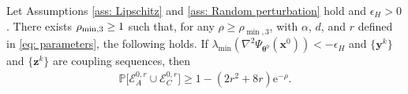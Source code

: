 \documentclass{siamart251216}
\begin{document}
\begin{lemma}
    \label{lem: Dynamic concentration 2}
    Let Assumptions \ref{ass: Lipschitz} and \ref{ass: Random perturbation} hold and $\epsilon_H>0$. There exists $\rho_{\min,3}\newline\geq1$ such that, for any $\rho\geq\rho_{\min,3}$, with $\alpha$, $d$, and $r$ defined in \eqref{eq: parameters}, the following holds. If $\lambda_{\min}(\nabla^{2}\Psi_{\boldsymbol{\theta}^{0}}(\mathbf{x}^{0}))<-\epsilon_H$ and $\{\mathbf{y}^{k}\}$ and $\{\mathbf{z}^{k}\}$ are coupling sequences, then
    \begin{gather*}
        \mathbb{P}\Big[\mathcal{E}_{A}^{0,r}\cup\mathcal{E}_{C}^{0,r}\Big]\geq1-(2r^{2}+8r)\mathrm{e}^{-\rho}.
    \end{gather*}
\end{lemma}
\end{document}
